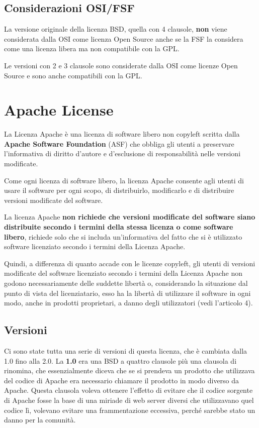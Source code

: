 \subsection{Considerazioni OSI/FSF}

La versione originale della licenza BSD, quella con 4 clausole, \textbf{non} viene considerata dalla OSI come licenza Open Source anche se la FSF la considera come una licenza libera ma non compatibile con la GPL.

Le versioni con 2 e 3 clausole sono considerate dalla OSI come licenze Open Source e sono anche compatibili con la GPL.

\section{Apache License}

La Licenza Apache è una licenza di software libero non copyleft scritta dalla \textbf{Apache Software Foundation} (ASF) che obbliga gli utenti a preservare l'informativa di diritto d'autore e d'esclusione di responsabilità nelle versioni modificate.

Come ogni licenza di software libero, la licenza Apache consente agli utenti di usare il software per ogni scopo, di distribuirlo, modificarlo e di distribuire versioni modificate del software.

La licenza Apache \textbf{non richiede che versioni modificate del software siano distribuite secondo i termini della stessa licenza o come software libero}, richiede solo che si includa un'informativa del fatto che si è utilizzato software licenziato secondo i termini della Licenza Apache.

Quindi, a differenza di quanto accade con le licenze copyleft, gli utenti di versioni modificate del software licenziato secondo i termini della Licenza Apache non godono necessariamente delle suddette libertà o, considerando la situazione dal punto di vista del licenziatario, esso ha la libertà di utilizzare il software in ogni modo, anche in prodotti proprietari, a danno degli utilizzatori (vedi l'articolo 4).

\subsection{Versioni}

Ci sono state tutta una serie di versioni di questa licenza, che è cambiata dalla 1.0 fino alla 2.0. La \textbf{1.0} era una BSD a quattro clausole più una clausola di rinomina, che essenzialmente diceva che se si prendeva un prodotto che utilizzava del codice di Apache era necessario chiamare il prodotto in modo diverso da Apache. Questa clausola voleva ottenere l'effetto di evitare che il codice sorgente di Apache fosse la base di una miriade di web server diversi che utilizzavano quel codice lì, volevano evitare una frammentazione eccessiva, perché sarebbe stato un danno per la comunità. 

